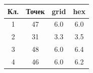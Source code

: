 \label{tab:share}\small\centering
\begin{tabular}{cccc}
\toprule
Кл. & Точек & grid & hex \\
\midrule
1 & 47 & 6.0 & 6.0 \\
2 & 31 & 3.3 & 3.5 \\
3 & 48 & 6.0 & 6.4 \\
4 & 46 & 6.0 & 6.2 \\
\bottomrule
\end{tabular}
